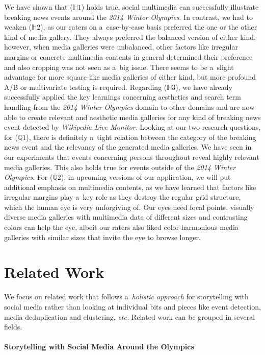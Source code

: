 \documentclass{sig-alternate}
\begin{document}
We have shown that ($\mathbb{H}1$) holds true,
social multimedia can successfully illustrate breaking news events
around the \emph{2014 Winter Olympics}.
In contrast, we had to weaken ($\mathbb{H}2$),
as our raters on a~case-by-case basis preferred
the one or the other kind of media gallery.
They always preferred the balanced version of either kind,
however, when media galleries were unbalanced,
other factors like irregular margins or
concrete multimedia contents in general determined their preference
and also cropping was not seen as a~big issue.
There seems to be a~slight advantage
for more square-like media galleries of either kind,
but more profound A/B or multivariate testing is required.
Regarding ($\mathbb{H}3$), we have already successfully
applied the key learnings concerning aesthetics
and search term handling from the \emph{2014 Winter Olympics} domain
to other domains and are now able to create relevant and aesthetic
media galleries for any kind of breaking news event
detected by \emph{Wikipedia Live Monitor}. 
Looking at our two research questions, for ($\mathbb{Q}1$),
there is definitely a~tight relation
between the category of the breaking news event
and the relevancy of the generated media galleries.
We have seen in our experiments that events concerning persons
throughout reveal highly relevant media galleries.
This also holds true for events outside of the \emph{2014 Winter Olympics}.
For ($\mathbb{Q}2$), in upcoming versions of our application,
we will put additional emphasis on multimedia contents,
as we have learned that factors like irregular margins play
a~key role as they destroy the regular grid structure,
which the human eye is very unforgiving of.
Our eyes need focal points,
visually diverse media galleries with multimedia data
of different sizes and contrasting colors can help the eye,
albeit our raters also liked color-harmonious media galleries
with similar sizes that invite the eye to browse longer.

\section{Related Work}
\label{sec:related-work}
\selectfont

We focus on related work that follows a~\emph{holistic approach}
for storytelling with social media
rather than looking at individual bits and pieces
like event detection, media deduplication and clustering, \emph{etc.}
Related work can be grouped in several fields.

\paragraph{Storytelling with Social Media Around the Olympics}
\end{document}
